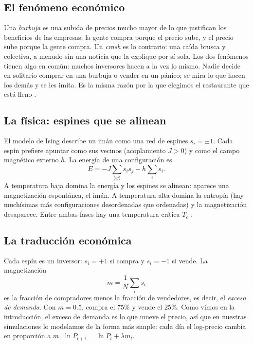 \documentclass[11pt,a4paper]{article}
\begin{document}
\subsection{El fenómeno económico}

Una \emph{burbuja} es una subida de precios mucho mayor de lo que justifican los beneficios de las
empresas: la gente compra porque el precio sube, y el precio sube porque la gente compra. Un \emph{crash}
es lo contrario: una caída brusca y colectiva, a menudo sin una noticia que la explique por sí sola. Los
dos fenómenos tienen algo en común: muchos inversores hacen a la vez lo mismo. Nadie decide en solitario
comprar en una burbuja o vender en un pánico; se mira lo que hacen los demás y se les imita. Es la misma
razón por la que elegimos el restaurante que está lleno \cite{kirman1993}.

\subsection{La física: espines que se alinean}

El modelo de Ising describe un imán como una red de espines $s_i=\pm1$. Cada espín prefiere apuntar como
sus vecinos (acoplamiento $J>0$) y como el campo magnético externo $h$. La energía de una configuración
es
\begin{equation}
E=-J\sum_{\langle ij\rangle}s_is_j-h\sum_is_i .
\end{equation}
A temperatura baja domina la energía y los espines se alinean: aparece una magnetización espontánea, el
imán. A temperatura alta domina la entropía (hay muchísimas más configuraciones desordenadas que
ordenadas) y la magnetización desaparece. Entre ambas fases hay una temperatura crítica $T_c$
\cite{uam_me3}.

\subsection{La traducción económica}

Cada espín es un inversor: $s_i=+1$ si compra y $s_i=-1$ si vende. La magnetización
\begin{equation}
m=\frac1N\sum_is_i
\end{equation}
es la fracción de compradores menos la fracción de vendedores, es decir, el \emph{exceso de demanda}.
Con $m=0.5$, compra el $75\%$ y vende el $25\%$. Como vimos en la introducción, el exceso de demanda es lo
que mueve el precio, así que en nuestras simulaciones lo modelamos de la forma más simple: cada día el
log-precio cambia en proporción a $m$, $\ln P_{t+1}=\ln P_t+\lambda m_t$.
\end{document}
